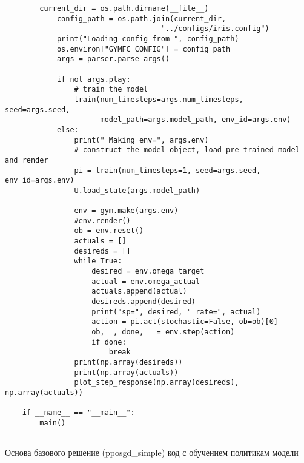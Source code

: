 \begin{verbatim}
        current_dir = os.path.dirname(__file__)
            config_path = os.path.join(current_dir,
                                    "../configs/iris.config")
            print("Loading config from ", config_path)
            os.environ["GYMFC_CONFIG"] = config_path
            args = parser.parse_args()

            if not args.play:
                # train the model
                train(num_timesteps=args.num_timesteps, seed=args.seed, 
                      model_path=args.model_path, env_id=args.env)
            else:
                print(" Making env=", args.env)
                # construct the model object, load pre-trained model and render
                pi = train(num_timesteps=1, seed=args.seed, env_id=args.env)
                U.load_state(args.model_path)

                env = gym.make(args.env)
                #env.render()
                ob = env.reset()
                actuals = []
                desireds = []
                while True:
                    desired = env.omega_target
                    actual = env.omega_actual
                    actuals.append(actual)
                    desireds.append(desired)
                    print("sp=", desired, " rate=", actual)
                    action = pi.act(stochastic=False, ob=ob)[0]
                    ob, _, done, _ = env.step(action)
                    if done:
                        break
                print(np.array(desireds))
                print(np.array(actuals))
                plot_step_response(np.array(desireds), np.array(actuals))

    if __name__ == "__main__":
        main()


\end{verbatim}

Основа базового решение (pposgd\_simple)
код с обучением политикам модели

